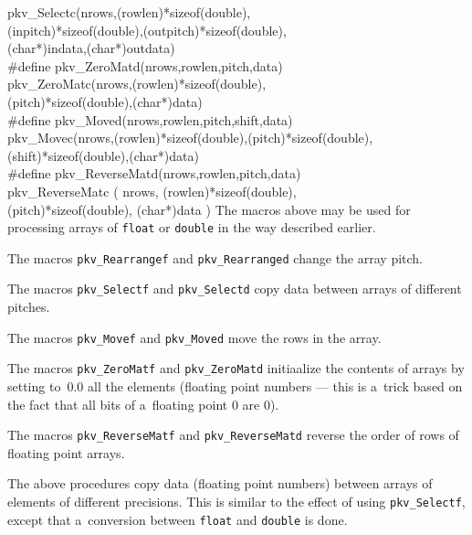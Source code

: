 {pkv\_Selectc(nrows,(rowlen)*sizeof(double), \bsl \\
(inpitch)*sizeof(double),(outpitch)*sizeof(double), \bsl \\
(char*)indata,(char*)outdata) \\
\#define pkv\_ZeroMatd(nrows,rowlen,pitch,data) \bsl \\
pkv\_ZeroMatc(nrows,(rowlen)*sizeof(double), \bsl \\
(pitch)*sizeof(double),(char*)data) \\
\#define pkv\_Moved(nrows,rowlen,pitch,shift,data) \bsl \\
pkv\_Movec(nrows,(rowlen)*sizeof(double),(pitch)*sizeof(double), \bsl \\
(shift)*sizeof(double),(char*)data) \\
\#define pkv\_ReverseMatd(nrows,rowlen,pitch,data) \bsl \\
pkv\_ReverseMatc ( nrows, (rowlen)*sizeof(double), \\
(pitch)*sizeof(double), (char*)data )}
The macros above may be used for processing arrays of \texttt{float}
or \texttt{double} in the way described earlier.

The macros \texttt{pkv\_Rearrangef} and \texttt{pkv\_Rearranged} change
the array pitch.

The macros \texttt{pkv\_Selectf} and \texttt{pkv\_Selectd} copy data
between arrays of different pitches.

The macros \texttt{pkv\_Movef} and \texttt{pkv\_Moved} move the rows
in the array.

The macros \texttt{pkv\_ZeroMatf} and \texttt{pkv\_ZeroMatd} initiaalize
the contents of arrays by setting to~$0.0$ all the elements
(floating point numbers --- this is a~trick based on the fact that
all bits of a~floating point $0$ are $0$).

The macros \texttt{pkv\_ReverseMatf} and \texttt{pkv\_ReverseMatd} reverse
the order of rows of floating point arrays.


\vspace{\bigskipamount}
The above procedures copy data (floating point numbers) between arrays
of elements of different precisions. This is similar to the effect
of using \texttt{pkv\_Selectf}, except that a~conversion between \texttt{float}
and \texttt{double} is done.

